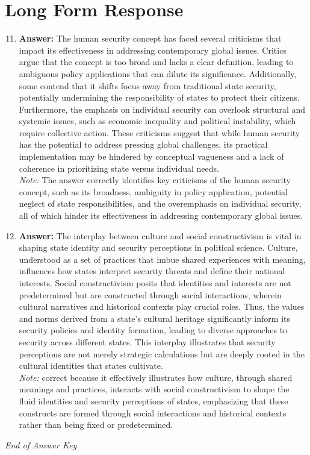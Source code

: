 \documentclass[12pt]{article}
\begin{document}
\section*{Long Form Response}
\begin{enumerate}[label=\arabic*.]
\setcounter{enumi}{10}
\item \textbf{Answer:} The human security concept has faced several criticisms that impact its effectiveness in addressing contemporary global issues. Critics argue that the concept is too broad and lacks a clear definition, leading to ambiguous policy applications that can dilute its significance. Additionally, some contend that it shifts focus away from traditional state security, potentially undermining the responsibility of states to protect their citizens. Furthermore, the emphasis on individual security can overlook structural and systemic issues, such as economic inequality and political instability, which require collective action. These criticisms suggest that while human security has the potential to address pressing global challenges, its practical implementation may be hindered by conceptual vagueness and a lack of coherence in prioritizing state versus individual needs.
\\ \textit{Note:} The answer correctly identifies key criticisms of the human security concept, such as its broadness, ambiguity in policy application, potential neglect of state responsibilities, and the overemphasis on individual security, all of which hinder its effectiveness in addressing contemporary global issues.
\item \textbf{Answer:} The interplay between culture and social constructivism is vital in shaping state identity and security perceptions in political science. Culture, understood as a set of practices that imbue shared experiences with meaning, influences how states interpret security threats and define their national interests. Social constructivism posits that identities and interests are not predetermined but are constructed through social interactions, wherein cultural narratives and historical contexts play crucial roles. Thus, the values and norms derived from a state's cultural heritage significantly inform its security policies and identity formation, leading to diverse approaches to security across different states. This interplay illustrates that security perceptions are not merely strategic calculations but are deeply rooted in the cultural identities that states cultivate.
\\ \textit{Note:} correct because it effectively illustrates how culture, through shared meanings and practices, interacts with social constructivism to shape the fluid identities and security perceptions of states, emphasizing that these constructs are formed through social interactions and historical contexts rather than being fixed or predetermined.
\end{enumerate}

\vfill
\noindent\textit{End of Answer Key}
\end{document}

